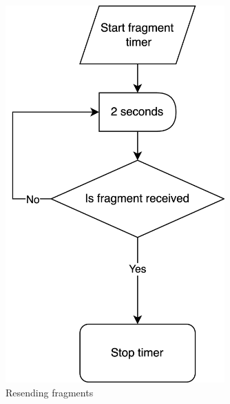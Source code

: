 \documentclass{article}
\begin{document}
\begin{figure}[!h]
    \centering
    \includegraphics[width=0.75\textwidth]{images/resend.png}
    \caption{Resending fragments}
    \label{fig:mesh2}
\end{figure}
\end{document}
